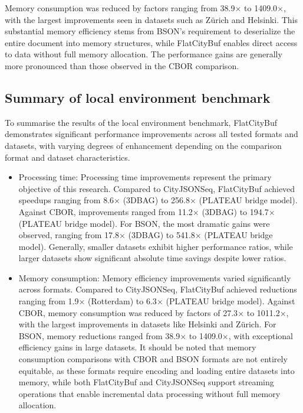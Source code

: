 Memory consumption was reduced by factors ranging from 38.9$\times$ to 1409.0$\times$, with the largest improvements seen in datasets such as Zürich and Helsinki. This substantial memory efficiency stems from BSON's requirement to deserialize the entire document into memory structures, while FlatCityBuf enables direct access to data without full memory allocation. The performance gains are generally more pronounced than those observed in the CBOR comparison.

\subsection{Summary of local environment benchmark}
\label{result:benchmark_on_local_environment:summary}
To summarise the results of the local environment benchmark, FlatCityBuf demonstrates significant performance improvements across all tested formats and datasets, with varying degrees of enhancement depending on the comparison format and dataset characteristics.

\begin{itemize}
  \item Processing time: Processing time improvements represent the primary objective of this research. Compared to CityJSONSeq, FlatCityBuf achieved speedups ranging from 8.6$\times$ (3DBAG) to 256.8$\times$ (PLATEAU bridge model). Against CBOR, improvements ranged from 11.2$\times$ (3DBAG) to 194.7$\times$ (PLATEAU bridge model). For BSON, the most dramatic gains were observed, ranging from 17.8$\times$ (3DBAG) to 541.8$\times$ (PLATEAU bridge model). Generally, smaller datasets exhibit higher performance ratios, while larger datasets show significant absolute time savings despite lower ratios.

  \item Memory consumption: Memory efficiency improvements varied significantly across formats. Compared to CityJSONSeq, FlatCityBuf achieved reductions ranging from 1.9$\times$ (Rotterdam) to 6.3$\times$ (PLATEAU bridge model). Against CBOR, memory consumption was reduced by factors of 27.3$\times$ to 1011.2$\times$, with the largest improvements in datasets like Helsinki and Zürich. For BSON, memory reductions ranged from 38.9$\times$ to 1409.0$\times$, with exceptional efficiency gains in large datasets. It should be noted that memory consumption comparisons with CBOR and BSON formats are not entirely equitable, as these formats require encoding and loading entire datasets into memory, while both FlatCityBuf and CityJSONSeq support streaming operations that enable incremental data processing without full memory allocation.
\end{itemize}

